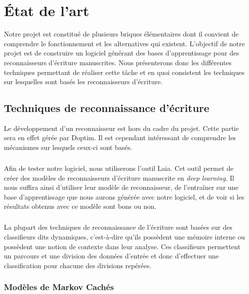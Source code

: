 \chapter{État de l'art}

Notre projet est constitué de plusieurs briques élémentaires dont il convient de comprendre
le fonctionnement et les alternatives qui existent. L’objectif de notre projet est de construire
un logiciel générant des bases d’apprentissage pour des reconnaisseurs d’écriture manuscrites.
Nous présenterons donc les différentes techniques permettant de réaliser cette tâche et en quoi
consistent les techniques sur lesquelles sont basés les reconnaisseurs d’écriture.

\section{Techniques de reconnaissance d'écriture}

Le développement d’un reconnaisseur est hors du cadre du projet. Cette partie sera en effet
gérée par Doptim. Il est cependant intéressant de comprendre les mécanismes sur lesquels ceux-ci
sont basés.

\paragraph{}
Afin de tester notre logiciel, nous utiliserons l’outil Laia. Cet outil permet de créer des
modèles de reconnaisseurs d’écriture manuscrite en \textit{deep learning}. Il nous suffira ainsi
d’utiliser leur modèle de reconnaisseur, de l’entraîner sur une base d’apprentissage que nous aurons
générée avec notre logiciel, et de voir si les résultats obtenus avec ce modèle sont bons ou non. 

\paragraph{}
La plupart des techniques de reconnaissance de l'écriture sont basées sur des classifieurs
dits dynamiques, c'est-à-dire qu'ils possèdent une mémoire interne ou possèdent une notion
de contexte dans leur analyse. Ces classifieurs permettent un parcours et une division des
données d'entrée et donc d'effectuer une classification pour chacune des divisions repérées. 
		
\subsection{Modèles de Markov Cachés}

